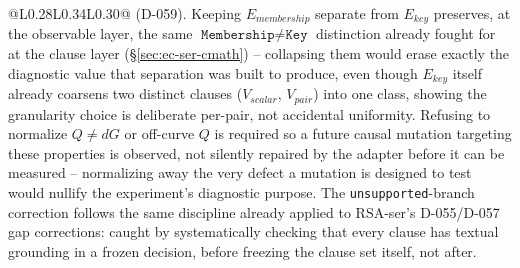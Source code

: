 \documentclass[11pt,a4paper]{article}
\begin{document}
\begin{longtable}{@{}L{0.28\textwidth}L{0.34\textwidth}L{0.30\textwidth}@{}}
(D-059). Keeping $E_{membership}$ separate from $E_{key}$ preserves, at the observable layer, the same $\texttt{Membership}\neq\texttt{Key}$ distinction already fought for at the clause layer (\S\ref{sec:ec-ser-cmath}) -- collapsing them would erase exactly the diagnostic value that separation was built to produce, even though $E_{key}$ itself already coarsens two distinct clauses ($V_{scalar}$, $V_{pair}$) into one class, showing the granularity choice is deliberate per-pair, not accidental uniformity. Refusing to normalize $Q\neq dG$ or off-curve $Q$ is required so a future causal mutation targeting these properties is observed, not silently repaired by the adapter before it can be measured -- normalizing away the very defect a mutation is designed to test would nullify the experiment's diagnostic purpose. The \texttt{unsupported}-branch correction follows the same discipline already applied to RSA-ser's D-055/D-057 gap corrections: caught by systematically checking that every clause has textual grounding in a frozen decision, before freezing the clause set itself, not after.\\

\end{longtable}
\end{document}
